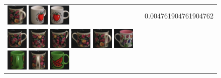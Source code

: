 \begin{figure}[!bp]
\begin{tabular}{m{11cm} | m{3cm} |}
\includegraphics[width=1cm]{coil/beeld-64.eps}
\includegraphics[width=1cm]{coil/beeld-39.eps}
\includegraphics[width=1cm]{coil/beeld-36.eps}
& {\scriptsize 0.004761904761904762}
\\
\includegraphics[width=1cm]{coil/beeld-60.eps}
\includegraphics[width=1cm]{coil/beeld-62.eps}
\includegraphics[width=1cm]{coil/beeld-63.eps}
\includegraphics[width=1cm]{coil/beeld-61.eps}
\includegraphics[width=1cm]{coil/beeld-64.eps}
\includegraphics[width=1cm]{coil/beeld-7.eps}
\includegraphics[width=1cm]{coil/beeld-35.eps}
\includegraphics[width=1cm]{coil/beeld-65.eps}
\includegraphics[width=1cm]{coil/beeld-30.eps}

\end{tabular}
\end{figure}
